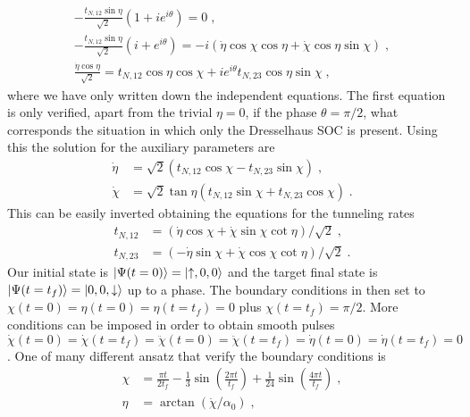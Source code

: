 \begin{subequations}
	\begin{gather}
	-\frac{t_{N,12}\sin\eta}{\sqrt{2}}(1+ie^{i\theta})=0\; ,\\
	-\frac{t_{N,12}\sin\eta}{\sqrt{2}}(i+e^{i\theta})=-i(\dot{\eta}\cos\chi\cos\eta+\dot{\chi}\cos\eta\sin\chi)\; ,\\
	\frac{\dot{\eta}\cos\eta}{\sqrt{2}}=t_{N,12}\cos\eta\cos\chi+ie^{i\theta}t_{N,23}\cos\eta\sin\chi\; ,
	\end{gather}
\end{subequations}
where we have only written down the independent equations. The first equation is only verified, apart from the trivial $\eta=0$, if the phase $\theta=\pi/2$, what corresponds the situation in which only the Dresselhaus SOC is present. Using this the solution for the auxiliary parameters are
\begin{subequations}
	\begin{align}
		\dot{\eta}&=\sqrt{2}(t_{N,12}\cos\chi-t_{N,23}\sin\chi)\; ,\\
		\dot{\chi}&=\sqrt{2}\tan\eta(t_{N,12}\sin\chi+t_{N,23}\cos\chi)\; .
	\end{align}
\end{subequations}
This can be easily inverted obtaining the equations for the tunneling rates
\begin{subequations}
	\begin{align}
	t_{N,12}&=(\dot{\eta}\cos\chi+ \dot{\chi}\sin\chi\cot\eta)/\sqrt{2}\; ,\\
	t_{N,23}&=(-\dot{\eta}\sin\chi+ \dot{\chi}\cos\chi\cot\eta)/\sqrt{2}\; .
	\end{align}
	\label{eq:STA_pulses}
\end{subequations}
Our initial state is $\ket{\Psi(t=0)}=\ket{\uparrow,0,0}$ and the target final state is $\ket{\Psi(t=t_f)}=\ket{0,0,\downarrow}$ up to a phase. The boundary conditions in then set to $\chi(t=0)=\eta(t=0)=\eta(t=t_f)=0$ plus $\chi(t=t_f)=\pi/2$. More conditions can be imposed in order to obtain smooth pulses $\dot{\chi}(t=0)=\dot{\chi}(t=t_f)=\ddot{\chi}(t=0)=\ddot{\chi}(t=t_f)=\dot{\eta}(t=0)=\dot{\eta}(t=t_f)=0$. One of many different ansatz that verify the boundary conditions is
\begin{subequations}
	\begin{align}
	\chi&=\frac{\pi t}{2 t_{f}}-\frac{1}{3} \sin \left(\frac{2 \pi t}{t_{f}}\right)+\frac{1}{24} \sin \left(\frac{4 \pi t}{t_{f}}\right)\; , \\
	\eta&=\arctan \left(\dot{\chi} / \alpha_{0}\right)\; ,
	\end{align}
\end{subequations}
